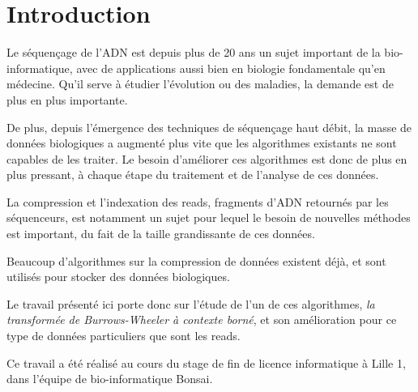 \section*{Introduction} %

Le séquençage de l'ADN est depuis plus de 20 ans un sujet important de la bio-informatique, avec de applications aussi bien en biologie fondamentale qu'en médecine. Qu'il serve à étudier l'évolution ou des maladies, la demande est de plus en plus importante.

De plus, depuis l'émergence des techniques de séquençage haut débit, la masse de données biologiques a augmenté plus vite que les algorithmes existants ne sont capables de les traiter. Le besoin d'améliorer ces algorithmes est donc de plus en plus pressant, à chaque étape du traitement et de l'analyse de ces données.

La compression et l'indexation des reads, fragments d'ADN retournés par les séquenceurs, est notamment un sujet pour lequel le besoin de nouvelles méthodes est important, du fait de la taille grandissante de ces données.

Beaucoup d'algorithmes sur la compression de données existent déjà, et sont utilisés pour stocker des données biologiques. 

Le travail présenté ici porte donc sur l'étude de l'un de ces algorithmes, \textit{la transformée de Burrows-Wheeler à contexte borné}, et son amélioration pour ce type de données particuliers que sont les reads.

Ce travail a été réalisé au cours du stage de fin de licence informatique à Lille 1, dans l'équipe de bio-informatique Bonsai.






